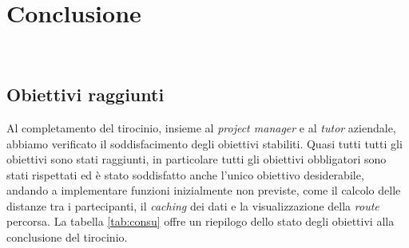
\chapter{Conclusione}
\label{cap:cap4}

\\

\section{Obiettivi raggiunti}
Al completamento del tirocinio, insieme al \textit{project manager} e al \textit{tutor} aziendale, abbiamo verificato il soddisfacimento degli obiettivi stabiliti. Quasi tutti tutti gli obiettivi sono stati raggiunti, in particolare tutti gli obiettivi obbligatori sono stati rispettati ed è stato soddisfatto anche l'unico obiettivo desiderabile, andando a implementare funzioni inizialmente non previste, come il calcolo delle distanze tra i partecipanti, il \textit{caching} dei dati e la visualizzazione della \textit{route} percorsa. La tabella \ref{tab:consu} offre un riepilogo dello stato degli obiettivi alla conclusione del tirocinio.

